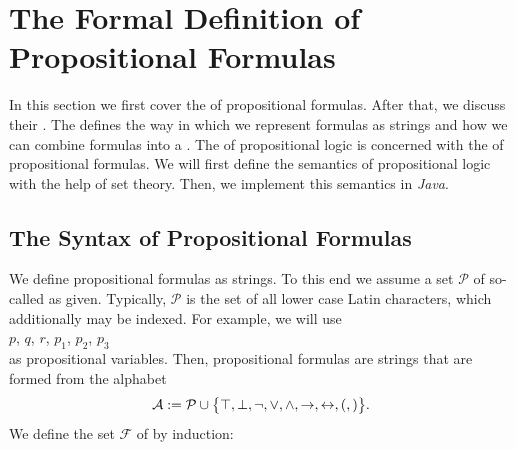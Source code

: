 \section{The Formal Definition of Propositional Formulas}
In this section we first cover the  of propositional formulas.  After that, we discuss their
. The   defines the way in which we represent formulas as strings
and how we can combine formulas into a .  The   of propositional
logic is concerned with the   of propositional formulas.
We will first define the semantics of propositional logic with the help of set theory.
Then, we implement this semantics in \textsl{Java}.

\subsection{The Syntax of Propositional Formulas}
We define propositional formulas as strings.  To this end we assume a set  $\mathcal{P}$  
of so-called  as given. 
Typically, $\mathcal{P}$ is the set of all lower case Latin characters, which additionally may be indexed.
For example, we will use 
\\[0.2cm]
\hspace*{1.3cm}
$p$, $q$, $r$, $p_1$, $p_2$, $p_3$
\\[0.2cm]
as propositional variables.  Then, propositional formulas are strings that are formed from the alphabet
$$ 
  \mathcal{A} := \mathcal{P} \cup \bigl\{ \top, \bot, \neg, \vee, \wedge,
   \rightarrow, \leftrightarrow, (, ) \bigr\}.
$$
We define the set $\mathcal{F}$ of 
by induction:
